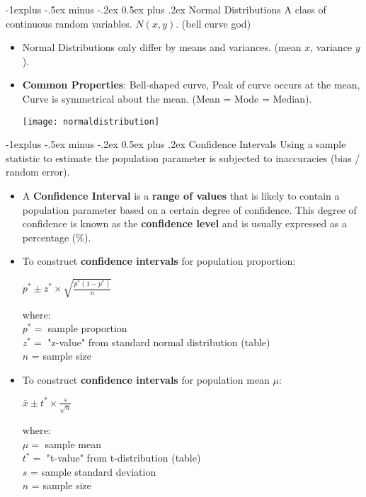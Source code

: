 \documentclass[10pt, landscape]{article}
\makeatletter
\renewcommand{\subsection}{\@startsection{subsection}{2}{0mm}%
                                {-1explus -.5ex minus -.2ex}%
                                {0.5ex plus .2ex}%
                                {\normalfont\normalsize\bfseries}}
\makeatother
\begin{document}
\begin{multicols*}{4}
\subsection{Normal Distributions}
A class of continuous random variables. $N(x,y)$. (bell curve god)
\begin{itemize}
	\item Normal Distributions only differ by means and variances. (mean $x$, variance $y$).
	\item \textbf{Common Properties}: Bell-shaped curve, Peak of curve occurs at the mean, Curve is symmetrical about the mean. (Mean = Mode = Median).
	\begin{center}\texttt{[image: normaldistribution]}\end{center}
\end{itemize}


\subsection{Confidence Intervals}
Using a sample statistic to estimate the population parameter is subjected to inaccuracies (bias / random error).
\begin{itemize}
	\item A \textbf{Confidence Interval} is a \textbf{range of values} that is likely to contain a population parameter based on a certain degree of confidence. This degree of confidence is known as the \textbf{confidence level} and is usually expressed as a percentage (\%). \\
	\item To construct \textbf{confidence intervals} for population proportion: \\
	\centerline{$p^* \pm z^* \times \sqrt{\frac{p^* (1-p^*)}{n}} $} 
	where: \\
	$p^* =$ sample proportion  \\
	$z^* =$ "z-value" from standard normal distribution (table)\\
	$n$ = sample size
	\item To construct \textbf{confidence intervals} for population mean $\mu$: \\
	\centerline{$ \bar{x} \pm t^* \times \frac{s}{\sqrt{n}} $} 
	where: \\
	$\mu =$ sample mean\\
	$t^* =$ "t-value" from t-distribution (table)\\
	$s$ = sample standard deviation \\
	$n$ = sample size


\end{itemize}
\end{multicols*}
\end{document}
